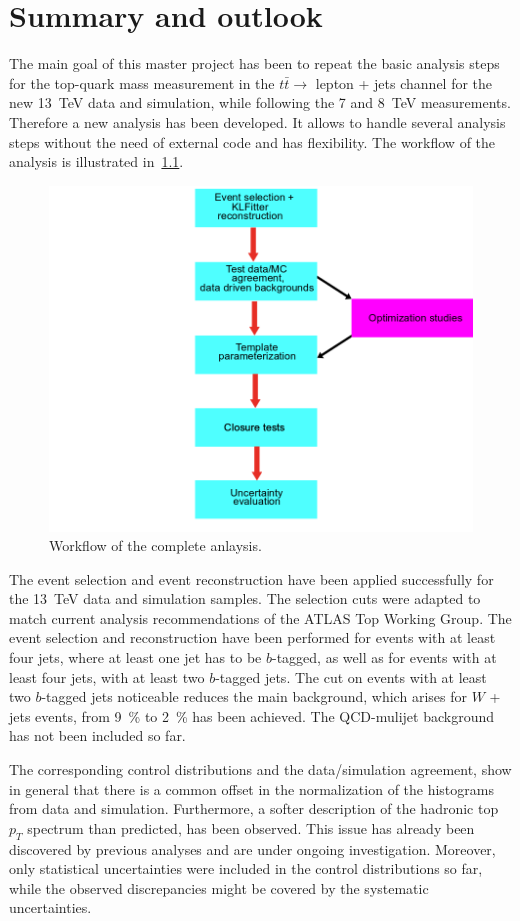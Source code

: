 \chapter{Summary and outlook}
\label{sec:sum}

The main goal of this master project has been to repeat the basic analysis steps for the top-quark mass measurement in the $t\bar{t} \rightarrow $ lepton + jets channel for the new 13~TeV data and simulation, while following the  7 and 8~TeV measurements. Therefore a new analysis  has been developed. It allows to handle several analysis steps without the need of external code and has flexibility. The workflow of the analysis is illustrated in~\cref{fig:Workflow}.

\begin{figure}
	\center
	\includegraphics[width=0.6\linewidth]{Pics/Workflow}
	\caption{Workflow of the complete anlaysis.} \label{fig:Workflow}
\end{figure}

 The event selection and event reconstruction have been applied successfully for the 13~TeV data and simulation samples. The selection cuts were adapted to match current analysis recommendations of the ATLAS Top Working Group. The event selection and reconstruction have been performed for events with at least four jets, where at least one jet has to be $b$-tagged, as well as for events with at least four jets, with  at least two $b$-tagged jets.  The cut on events with at least two $b$-tagged jets noticeable reduces the main background, which arises for $W$  + jets events, from 9~\% to 2~\% has been  achieved. The QCD-mulijet background has not been included so far. 
 
 The corresponding control distributions and  the data/simulation agreement, show in general that there is a common offset in the normalization of the histograms from data and simulation. Furthermore, a softer description of the hadronic top $p_T$ spectrum than predicted, has been observed. This issue has already been discovered by previous analyses and are under ongoing investigation. Moreover, only statistical uncertainties were included in the control distributions so far, while the observed discrepancies might be covered by the systematic uncertainties.
 

